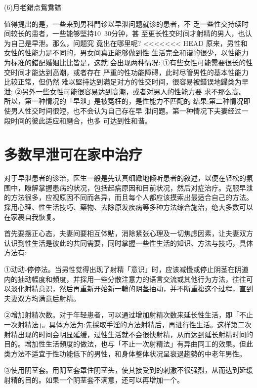 \documentclass[12pt,UTF8]{ctexbook}
\begin{document}
(6)月老錯点鴛鴦譜

值得提出的是，一些来到男科門诊以早泄问题就诊的患者，不
乏一些性交持续时间较长的患者，一些能够堅持10~30分钟，甚
至更长性交时间才射精的男人，也认为自己是早泄。那么，问题究
竟出在哪里呢?
<<<<<<< HEAD
原来，男性和女性的性能力是不同的，男女间真正能够做到性
生活完全和谐的很少，以性能力为标准的錯配婚姻比比皆是，这就
会出现两种情况:
①有些女性可能需要很长的性交时间才能达到高潮，或者存在
严重的性功能障碍，此时尽管男性的基本性能力比较正常，但仍然
难以堅持达到满足对方的性交时间，很容易被錯误地歸类为早泄;
②另外一些女性可能很容易达到高潮，或者对男人的性能力要
求不那么高。
所以，第一种情况的「早泄」是被冤枉的，是性能力不匹配的
结果;第二种情况即使男人性交时间很短，也不会认为自己存在早
泄问题。第一种情况下夫妻经过一段时间的彼此适应和磨合，也多
可达到性和谐。

\section{多数早泄可在家中治疗}

对于早泄患者的诊治，医生一般是先认真细緻地倾听患者的敘述，以便在轻松的氛围中，瞭解掌握患病的状况，包括起病原因和目前状况，然后对症治疗。克服早泄的方法很多，应视原因不同而各异，而且每个人都应该摸索出最适合自己的方法。採用心理、性生活技巧、藥物、去除原发疾病等多种方法综合施治，绝大多数可以在家裹自我恢复。

首先要摆正心态，夫妻间要相互体贴，消除紧张心理及一切焦虑因素，让夫妻双方认识到性生活是彼此的共同需要，同时掌握一些性生活的知识、方法与技巧，具体方法有:

①动动-停停法。当男性觉得出现了射精「意识」时，应该减慢或停止阴茎在阴道内的抽动幅度和頻度，并採用一些分散注意力的语言交流或其他行为方法，往往可以淡化射精意识，然后再重新开始新一輪的阴茎抽动，并不断重複这个过程，直到夫妻双方均满意后射精。

②增加射精次数。对于年轻患者，可以通过增加射精次数来延长性生活，即「不止一次射精法」。具体方法为:先採取手淫的方法射精后，再进行性生活。这样第二次射精出现的时间会明显延缓，过性生活就不会很快射精，从而达到延长射精时间的目的。增加性生活頻度的做法，也与「不止一次射精法」有异曲同工的效果。但此类方法不适宜于性功能低下的男性，和身体整体状况呈衰退趨勢的中老年男性。

③使用阴茎套。用阴茎套罩住阴茎头，使其接受到的刺激不很强烈，从而达到延缓射精的目的。如果一个阴茎套不满意，还可以再增加一个。
\end{document}
